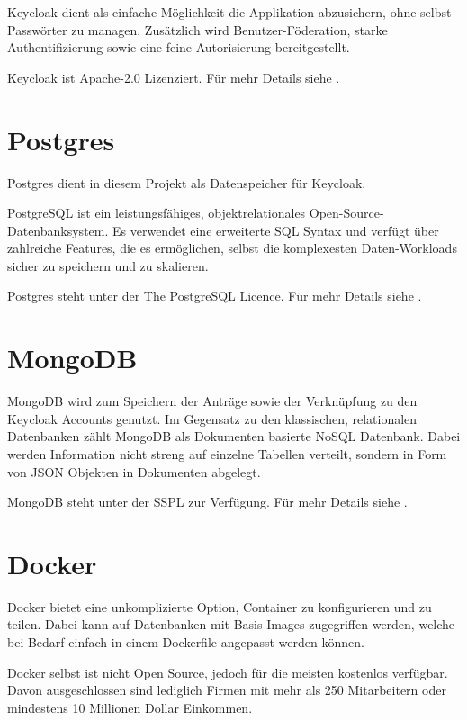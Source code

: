 Keycloak dient als einfache Möglichkeit die Applikation abzusichern, ohne selbst Passwörter zu managen.
Zusätzlich wird Benutzer-Föderation, starke Authentifizierung sowie eine feine Autorisierung bereitgestellt.
\cite{about-keycloak}

Keycloak ist Apache-2.0 Lizenziert.
Für mehr Details siehe .

\section{Postgres}\label{sec:postgres}

Postgres dient in diesem Projekt als Datenspeicher für Keycloak.

PostgreSQL ist ein leistungsfähiges, objektrelationales Open-Source-Datenbanksystem.
Es verwendet eine erweiterte SQL Syntax und verfügt über zahlreiche Features,
die es ermöglichen, selbst die komplexesten Daten-Workloads sicher zu speichern und zu skalieren.
\cite{about-postgres}

Postgres steht unter der The PostgreSQL Licence.
Für mehr Details siehe .


\section{MongoDB}\label{sec:mongodb}

MongoDB wird zum Speichern der Anträge sowie der Verknüpfung zu den Keycloak Accounts genutzt.
Im Gegensatz zu den klassischen, relationalen Datenbanken zählt MongoDB als Dokumenten basierte NoSQL Datenbank.
Dabei werden Information nicht streng auf einzelne Tabellen verteilt, sondern in Form von \ac{JSON} Objekten in Dokumenten abgelegt.

MongoDB steht unter der \acl{SSPL} zur Verfügung.
Für mehr Details siehe .

\section{Docker}\label{sec:docker}

Docker bietet eine unkomplizierte Option, Container zu konfigurieren und zu teilen.
Dabei kann auf Datenbanken mit Basis Images zugegriffen werden, welche bei Bedarf
einfach in einem Dockerfile angepasst werden können.

Docker selbst ist nicht Open Source, jedoch für die meisten kostenlos verfügbar.
Davon ausgeschlossen sind lediglich Firmen mit mehr als 250 Mitarbeitern oder mindestens 10 Millionen Dollar Einkommen.

